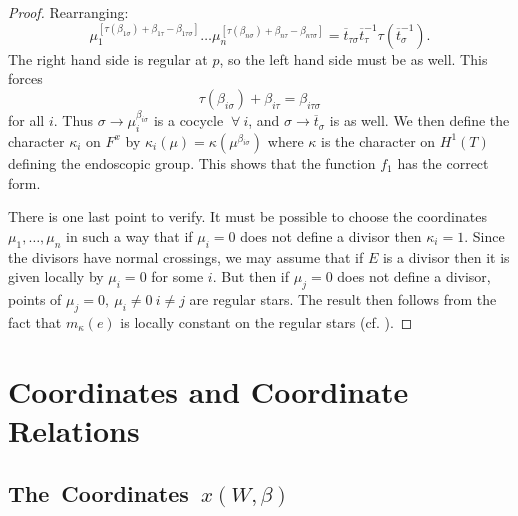 \documentclass{memo-l}
\theoremstyle{definition}
\theoremstyle{remark}
\numberwithin{section}{chapter}
\numberwithin{equation}{chapter}
\begin{document}
\begin{proof}
\noindent
Rearranging:
$$
\mu_{1}^{[{\tau}({\beta}_{1{\sigma}})+{\beta}_{1{\tau}}-
{\beta}_{1{\tau}{\sigma}}]} \ldots
{\mu}_{n}^{[{\tau}({\beta}_{n{\sigma}})+{\beta}_{n{\tau}}-{\beta}_{n{\tau}{\sigma}}]}
= \overline{t}_{{\tau}{\sigma}} \overline{t}_{{\tau}}^{-1}
{\tau}(\overline{t}_{{\sigma}}^{-1}).
$$
The right hand side is regular at $p$, so the left hand side must be as well.
 This forces
$$
{\tau}({\beta}_{i{\sigma}})+{\beta}_{i{\tau}} = {\beta}_{i{\tau}{\sigma}}
$$
for all $i$.
 Thus ${\sigma} {\to} {\mu}_{i}^{{\beta}_{i{\sigma}}}$  is a cocycle
${\ \forall \ } i$, and ${\sigma} {\to} \overline{t}_{{\sigma}}$
is as well.
 We then define the character ${\kappa}_{i}$ on $F^{x}$ by
${\kappa}_{i}({\mu}) = {\kappa}({\mu}^{\beta_{i{\sigma}}})$
where ${\kappa}$ is the
character on $H^{1}(T)$ defining the endoscopic group.
 This shows that the function $f_{1}$ has the correct form.

   There is one last point to verify.
 It  must be possible to choose the coordinates ${\mu}_{1},\ldots, {\mu}_{n}$
in such a way that if ${\mu}_{i}=0$ does not define a divisor then
${\kappa}_{i}=1$.
 Since the divisors have normal crossings, we may assume that if $E$ is a
divisor then it is given locally by ${\mu}_{i}=0$ for some $i$.
 But then if ${\mu}_{j}=0$ does not define a divisor, points of ${\mu}_{j}=0,
\ {\mu}_{i}\ne 0 \ i\ne j$ are regular stars.
 The result then follows from the fact that $m_{{\kappa}}(e)$ is locally
constant on the regular stars (cf. \cite{MR701566}).
\end{proof}




\chapter{Coordinates and Coordinate Relations}




\section{The\ Coordinates\ $x(W,\beta)$ }
\end{document}

